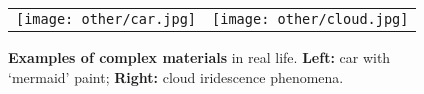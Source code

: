 \begin{figure}[h]
	\centering
	\setlength{\resLen}{3.in}
	\addtolength{\tabcolsep}{0pt}
	\begin{tabular}{cc}
		\texttt{[image: other/car.jpg]} & 
		\texttt{[image: other/cloud.jpg]} 
	\end{tabular}
	\caption[Examples of complex materials]{\label{fig:introduction:material}
		\textbf{Examples of complex materials} in real life.
		\textbf{Left:} car with `mermaid' paint; \textbf{Right:} cloud iridescence phenomena.
	}
\end{figure}